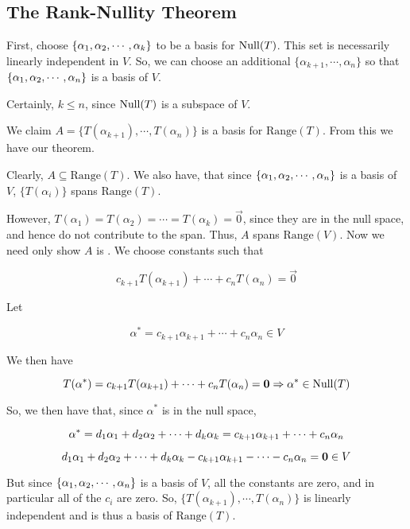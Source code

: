 \documentclass[12pt]{article}
\def\range{\text{Range}}
\begin{document}
  \subsection{The Rank-Nullity Theorem}
  {
    First, choose $\{\alpha_{1}, \alpha_{2}, \cdots, \alpha_{k}\}$ to be a basis for $\mathrm{Null}(T)$. This
    set is necessarily linearly independent in $V$. So, we can choose an
    additional $\{\alpha_{k+1}, \cdots, \alpha_n\}$ so that
    $\{\alpha_{1}, \alpha_{2}, \cdots, \alpha_{n}\}$ is a basis of $V$.
    
    Certainly, $k \leq n$, since $\mathrm{Null}(T)$ is a subspace of $V$.
    
    We claim $A = \{T(\alpha_{k+1}), \cdots, T(\alpha_{n})\}$ is a basis for
    $\range(T)$. From this we have our theorem.
    
    Clearly, $A \subseteq \range(T)$. We also have, that since
    $\{\alpha_{1}, \alpha_{2}, \cdots, \alpha_{n}\}$ is a basis of $V$, $\{T(\alpha_i)\}$ spans
    $\range(T)$.
    
    However, $T(\alpha_1) = T(\alpha_2) = \cdots = T(\alpha_k) = \vec{0}$, since
    they are in the null space, and hence do not contribute to the span. Thus,
    $A$ spans $\range(V)$. Now we need only show $A$ is \lind. We choose
    constants such that

    \[
      c_{k+1}T(\alpha_{k+1}) + \cdots + c_nT(\alpha_n) = \vec{0}
    \]

    Let 

    \[
      \alpha^* = c_{k+1}\alpha_{k+1} + \cdots + c_n\alpha_n \in V
    \]

    We then have
    
    \[
      T(\alpha^*) = c_{k+1}T(\alpha_{k+1}) + \cdots + c_nT(\alpha_n) = {\bf 0} \Rightarrow \alpha^* \in \mathrm{Null}(T)
    \]

    So, we then have that, since $\alpha^*$ is in the null space,

    \[
      \alpha^* = d_{1}\alpha_{1} + d_{2}\alpha_{2} + \cdots + d_{k}\alpha_{k} = c_{k+1}\alpha_{k+1} + \cdots + c_n\alpha_n
    \]

    \[
      d_{1}\alpha_{1} + d_{2}\alpha_{2} + \cdots + d_{k}\alpha_{k} - c_{k+1}\alpha_{k+1} - \cdots - c_n\alpha_n = {\bf 0} \in V
    \]

    But since $\{\alpha_{1}, \alpha_{2}, \cdots, \alpha_{n}\}$ is a basis of $V$, all the constants
    are zero, and in particular all of the $c_i$ are zero. So,
    $\{T(\alpha_{k+1}), \cdots, T(\alpha_n)\}$ is linearly independent and is
    thus a basis of $\range(T)$.
  }
\end{document}
